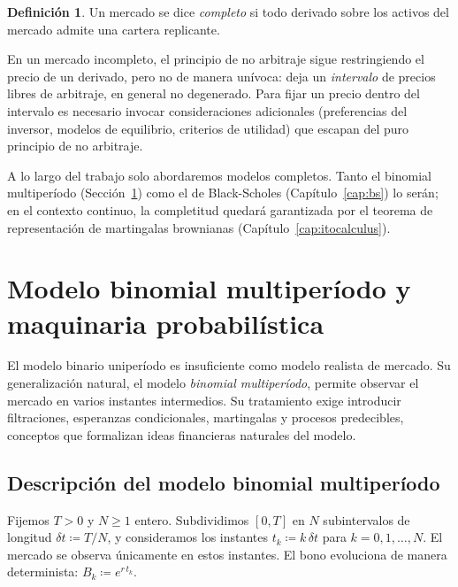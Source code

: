 \documentclass[11pt,a4paper,oneside]{report}
\theoremstyle{plain}
\theoremstyle{definition}
\newtheorem{definicion}[teorema]{Definición}
\theoremstyle{remark}
\newcommand{\1}{\mathbf{1}}
\newcommand{\eqdef}{\coloneqq}
\begin{document}
\begin{definicion}
\label{def:completitud_preliminar}
Un mercado se dice \emph{completo} si todo derivado sobre los activos
del mercado admite una cartera replicante.
\end{definicion}

En un mercado incompleto, el principio de no arbitraje sigue
restringiendo el precio de un derivado, pero no de manera unívoca: deja
un \emph{intervalo} de precios libres de arbitraje, en general no
degenerado. Para fijar un precio dentro del intervalo es necesario
invocar consideraciones adicionales (preferencias del inversor,
modelos de equilibrio, criterios de utilidad) que escapan del puro
principio de no arbitraje.

A lo largo del trabajo solo abordaremos modelos completos. Tanto el
binomial multiperíodo (Sección~\ref{sec:multiperiodo}) como el de
Black-Scholes (Capítulo~\ref{cap:bs}) lo serán; en el contexto
continuo, la completitud quedará garantizada por el teorema de
representación de martingalas brownianas
(Capítulo~\ref{cap:itocalculus}).

\section{Modelo binomial multiperíodo y maquinaria probabilística}
\label{sec:multiperiodo}

El modelo binario uniperíodo es insuficiente como modelo realista de
mercado. Su generalización natural, el modelo \emph{binomial
multiperíodo}, permite observar el mercado en varios instantes
intermedios. Su tratamiento exige introducir filtraciones, esperanzas
condicionales, martingalas y procesos predecibles, conceptos que
formalizan ideas financieras naturales del modelo.

\subsection{Descripción del modelo binomial multiperíodo}
\label{subsec:setup_multiperiodo}

Fijemos $T >
0$ y $N \geq 1$ entero. Subdividimos $[0, T]$ en $N$ subintervalos de
longitud $\delta t \eqdef T/N$, y consideramos los instantes $t_k \eqdef
k\, \delta t$ para $k = 0, 1, \ldots, N$. El mercado se observa
únicamente en estos instantes. El bono evoluciona de manera
determinista: $B_k \eqdef e^{r\, t_k}$.
\end{document}
